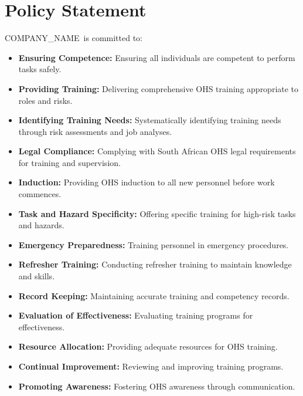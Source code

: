 \documentclass[11pt]{article}
\newcommand{\clientName}{{{COMPANY_NAME}}}
\begin{document}
\section{Policy Statement}
\clientName\ is committed to:
\begin{itemize}
    \item \textbf{Ensuring Competence:} Ensuring all individuals are competent to perform tasks safely.
    \item \textbf{Providing Training:} Delivering comprehensive OHS training appropriate to roles and risks.
    \item \textbf{Identifying Training Needs:} Systematically identifying training needs through risk assessments and job analyses.
    \item \textbf{Legal Compliance:} Complying with South African OHS legal requirements for training and supervision.
    \item \textbf{Induction:} Providing OHS induction to all new personnel before work commences.
    \item \textbf{Task and Hazard Specificity:} Offering specific training for high-risk tasks and hazards.
    \item \textbf{Emergency Preparedness:} Training personnel in emergency procedures.
    \item \textbf{Refresher Training:} Conducting refresher training to maintain knowledge and skills.
    \item \textbf{Record Keeping:} Maintaining accurate training and competency records.
    \item \textbf{Evaluation of Effectiveness:} Evaluating training programs for effectiveness.
    \item \textbf{Resource Allocation:} Providing adequate resources for OHS training.
    \item \textbf{Continual Improvement:} Reviewing and improving training programs.
    \item \textbf{Promoting Awareness:} Fostering OHS awareness through communication.
\end{itemize}
\end{document}
